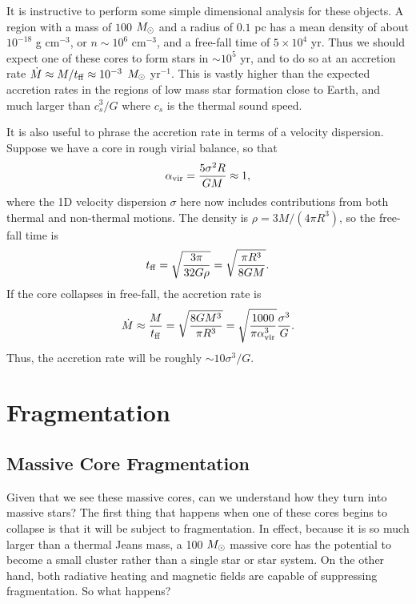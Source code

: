 It is instructive to perform some simple dimensional analysis for these objects. A region with a mass of $100$ $M_{\odot}$ and a radius of $0.1$ pc has a mean density of about $10^{-18}$ g cm$^{-3}$, or $n\sim 10^6$ cm$^{-3}$, and a free-fall time of $5\times 10^4$ yr. Thus we should expect one of these cores to form stars in $\sim 10^5$ yr, and to do so at an accretion rate $\dot{M}\approx M/t_{\rm ff} \approx 10^{-3}$ $M_{\odot}$ yr$^{-1}$. This is vastly higher than the expected accretion rates in the regions of low mass star formation close to Earth, and much larger than $c_s^3/G$ where $c_s$ is the thermal sound speed. 

It is also useful to phrase the accretion rate in terms of a velocity dispersion. Suppose we have a core in rough virial balance, so that
\begin{equation}
\alpha_{\rm vir} = \frac{5 \sigma^2 R}{G M} \approx 1,
\end{equation}
where the 1D velocity dispersion $\sigma$ here now includes contributions from both thermal and non-thermal motions. The density is $\rho=3 M/(4\pi R^3)$, so the free-fall time is
\begin{equation}
t_{\rm ff} = \sqrt{\frac{3\pi}{32 G \rho}} = \sqrt{\frac{\pi R^3}{8 G M}}.
\end{equation}
If the core collapses in free-fall, the accretion rate is
\begin{equation}
\dot{M} \approx \frac{M}{t_{\rm ff}} = \sqrt{\frac{8 G M^3}{\pi R^3}} = \sqrt{\frac{1000}{\pi\alpha_{\rm vir}^3}} \frac{\sigma^3}{G}.
\end{equation}
Thus, the accretion rate will be roughly $\sim 10 \sigma^3/G$.

\section{Fragmentation}

\subsection{Massive Core Fragmentation}

Given that we see these massive cores, can we understand how they turn into massive stars? The first thing that happens when one of these cores begins to collapse is that it will be subject to fragmentation. In effect, because it is so much larger than a thermal Jeans mass, a 100 $M_{\odot}$ massive core has the potential to become a small cluster rather than a single star or star system. On the other hand, both radiative heating and magnetic fields are capable of suppressing fragmentation. So what happens?

